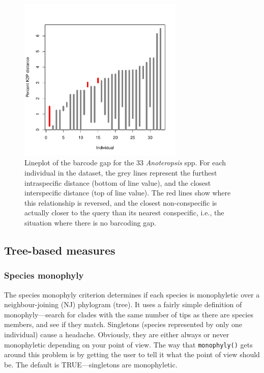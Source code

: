 \documentclass{article}
\newcommand{\fun}[1]{\texttt{#1}}
\begin{document}
\begin{figure}[p]
	\centering
	\includegraphics[width=0.7\textwidth,trim= 3cm 0cm 3cm 0cm]{barcode_gap}
	\caption{Lineplot of the barcode gap for the 33 \emph{Anoteropsis} spp. For each individual in the dataset, the grey lines represent the furthest intraspecific distance (bottom of line value), and the closest interspecific distance (top of line value). The red lines show where this relationship is reversed, and the closest non-conspecific is actually closer to the query than its nearest conspecific, i.e., the situation where there is no barcoding gap.}
	\label{barcode_gap.fig}
\end{figure}

\subsection{Tree-based measures}

\subsubsection{Species monophyly}

The species monophyly criterion determines if each species is monophyletic over a neighbour-joining (NJ) phylogram (tree). It uses a fairly simple definition of monophyly---search for clades with the same number of tips as there are species members, and see if they match. Singletons (species represented by only one individual) cause a headache. Obviously, they are either always or never monophyletic depending on your point of view. The way that \fun{monophyly()} gets around this problem is by getting the user to tell it what the point of view should be. The default is TRUE---singletons are monophyletic.
\end{document}
